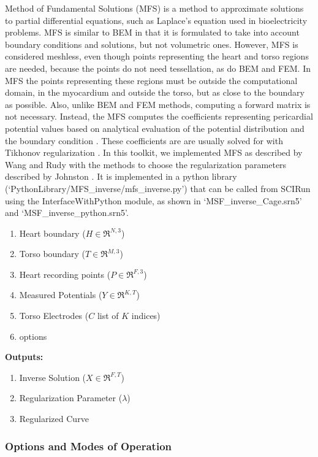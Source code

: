 Method of Fundamental Solutions (MFS) is a method to approximate
solutions to partial differential equations, such as Laplace's
equation used in bioelectricity problems.  MFS is similar to BEM in
that it is formulated to take into account boundary conditions and
solutions, but not volumetric ones.  However, MFS is considered
meshless, even though points representing the heart and torso regions
are needed, because the points do not need tessellation, as do BEM and
FEM. In MFS the points representing these regions must be outside the
computational domain, \ie{} in the myocardium and outside the torso,
but as close to the boundary as possible.  Also, unlike BEM and FEM
methods, computing a forward matrix is not necessary.  Instead, the
MFS computes the coefficients representing pericardial potential
values based on analytical evaluation of the potential distribution
and the boundary condition \cite{JDT:Mat77,JDT:Wan2006}.  These
coefficients are are usually solved for with Tikhonov regularization
\cite{JDT:Wan2006,JDT:Joh2018}.  In this toolkit, we implemented MFS
as described by Wang and Rudy \cite{JDT:Wan2006} with the methods to
choose the regularization parameters described by Johnston
\cite{JDT:Joh2018}.  It is implemented in a python library
(`PythonLibrary/MFS\_inverse/mfs\_inverse.py') that can be called from
SCIRun using the InterfaceWithPython module, as shown in
`MSF\_inverse\_Cage.srn5' and `MSF\_inverse\_python.srn5'.

    \begin{enumerate}
        \item Heart boundary ($H\in\Re^{N,3}$)
        \item Torso boundary ($T\in\Re^{M,3}$)
		\item Heart recording points ($P\in\Re^{F,3}$)
		\item Measured Potentials ($Y\in\Re^{K,T}$)
		\item Torso Electrodes ($C$ list of $K$ indices)
        \item options
    \end{enumerate}
    {\bf Outputs:}
     \begin{enumerate}
        \item Inverse Solution ($X\in\Re^{F,T}$)
        \item Regularization Parameter ($\lambda$)
        \item Regularized Curve 
    \end{enumerate}
	

\subsubsection{Options and Modes of Operation}

